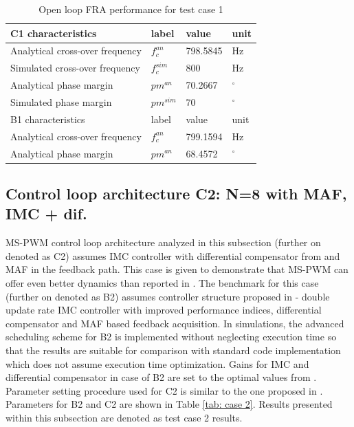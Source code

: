 \documentclass[journal]{IEEEtran}
\begin{document}
\begin{table}[h!]
			  \caption{Open loop FRA performance for test case 1}
              \label{tab:tc1_olfra}
              \centering
              \begin{tabular}{llll}
                           \midrule\midrule
        C1 characteristics & label & value   & unit\\
        \midrule               
                  Analytical cross-over frequency	& $f_{c}^{an}$ & 798.5845 &Hz\\
                  Simulated cross-over frequency	& $f_{c}^{sim}$ & 800 &Hz\\ 
                  Analytical phase margin  & $pm^{an}$ & 70.2667 &  $^\circ$   \\
                  Simulated phase margin  & $pm^{sim}$ & 70 &  $^\circ$   \\
                  \midrule\midrule
                  B1 characteristics & label  & value    & unit\\
                  \midrule
                  Analytical cross-over frequency	& $f_{c}^{an}$ & 799.1594 &Hz\\
                  Analytical phase margin  & $pm^{an}$ & 68.4572 &  $^\circ$   \\
                  \midrule\midrule
                                                        
              \end{tabular}
\end{table}

\subsection{Control loop architecture C2: N=8 with MAF, IMC + dif.}
MS-PWM control loop architecture analyzed in this subsection (further on denoted as C2) assumes IMC controller with differential compensator from \cite{vuksa2017} and MAF in the feedback path. This  case  is  given  to demonstrate  that  MS-PWM  can  offer  even  better  dynamics than  reported  in \cite{vuksa2017}. The benchmark for this case (further on denoted as B2) assumes controller structure proposed in \cite{vuksa2017} - double update rate IMC controller with improved performance indices, differential compensator and MAF based feedback acquisition. In simulations, the advanced scheduling scheme for B2 is implemented without neglecting execution time so that the results are suitable for comparison with standard code implementation which does not assume execution time optimization. Gains for IMC and differential compensator in case of B2 are set to the optimal values from \cite{vuksa2017}. Parameter setting procedure used for C2 is similar to the one proposed in \cite{vuksa2017}. Parameters for B2 and C2 are shown in Table \ref{tab: case 2}. Results presented within this subsection are denoted as test case 2 results. 
\par
\end{document}
